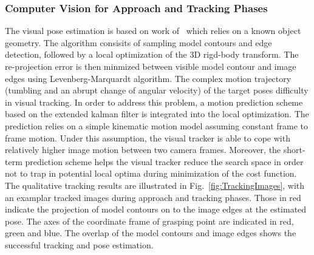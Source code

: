 \subsubsection{Computer Vision for Approach and Tracking Phases}


The visual pose estimation is based on work of~\cite{Drummond2002} which relies on a known object geometry. The algorithm consisits of sampling model contours and edge detection, followed by a local optimization of the 3D rigd-body transform. The re-projection error is then minmized between visible model contour and image edges using Levenberg-Marquardt algorithm.
The complex motion trajectory (tumbling and an abrupt change of angular velocity) of the target poses difficulty in visual tracking. In order to address this problem, a motion prediction scheme based on the extended kalman filter is integrated into the local optimization. The prediction relies on a simple kinematic motion model assuming constant frame to frame motion. Under this assumption, the visual tracker is able to cope with relatively higher image motion between two camera frames. Moreover, the short-term prediction scheme helps the visual tracker reduce the search space in order not to trap in potential local optima during minimization of the cost function. The qualitative tracking results are illustrated in Fig.~\ref{fig:TrackingImages}, with an examplar tracked images during approach and tracking phases. Those in red indicate the projection of model contours on to the image edges at the estimated pose. The axes of the coordinate frame of grasping point are indicated in red, green and blue. The overlap of the model contours and image edges shows the successful tracking and pose estimation.

